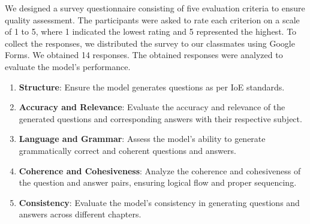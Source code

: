 \documentclass[12pt]{report}
\begin{document}
We designed a survey questionnaire consisting of five evaluation criteria to ensure quality assessment. The participants were asked to rate each criterion on a scale of 1 to 5, where 1 indicated the lowest rating and 5 represented the highest. To collect the responses, we distributed the survey to our classmates using Google Forms. We obtained 14 responses. The obtained responses were analyzed to evaluate the model's performance. 
\begin{enumerate}
    \item {\bfseries Structure}: Ensure the model generates questions as per IoE standards.
    \item {\bfseries Accuracy and Relevance}: Evaluate the accuracy and relevance of the generated questions and corresponding answers with their respective subject.
    \item {\bfseries Language and Grammar}: Assess the model's ability to generate grammatically correct and coherent questions and answers.
    \item {\bfseries Coherence and Cohesiveness}: Analyze the coherence and cohesiveness of the question and answer pairs, ensuring logical flow and proper sequencing.
    \item {\bfseries Consistency}: Evaluate the model's consistency in generating questions and answers across different chapters.
\end{enumerate}
\end{document}
